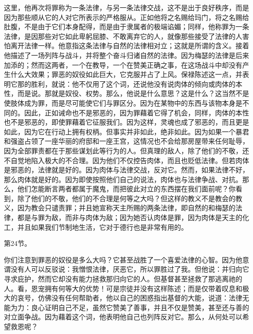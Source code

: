 这里，他再次将罪称为一条法律，与另一条法律交战，这不是出于良好秩序，而是因为那些顺从它的人对它所表示的严格服从。正如他将之名赐给玛门，将之名赐给肚腹，不是由于它们本身配得，而是由于隶属者的极端谄媚；同样，他称罪为一条法律，是因那些对它如此卑躬屈膝、不敢离弃它的人，就像那些接受了法律的人害怕离开法律一样。他意指这条法律与自然的法律相对立；这就是所谓的含义。接着他描述了一场列阵与战斗，并将整个奋斗归诸自然的法律。因为梅瑟的法律是后来加添的；然而这两者，一个在教导，一个在赞美正确之事，在这场战斗中却没有产生什么大效果；罪恶的奴役如此巨大，它克服并占了上风。保禄陈述这一点，并表明它那的胜利，就说：他不仅用了这个词，还说他没有说肉体的倾向或肉体的本性，而是说。那就是奴役、权势。那么，他说是什么意思？这是什么？这当然不是使肢体成为罪，而是尽可能使它们与罪区分。因为在某物中的东西与该物本身是不同的。因此，正如诫命也不是邪恶的，因为罪藉着它得了机会，同样，肉体的本性也不是邪恶的，即使罪藉着它征服我们。因为这样，灵魂也成了邪恶的，而且更是如此，因为它在行动上拥有权柄。但事实并非如此，绝非如此。因为如果一个暴君和强盗占领了一座华丽的府邸和一座王宫，这情况也不会给那房屋带来任何耻辱，因为全部罪责都在于那些谋划此等行为的人。但真理的敌人，除了他们的不敬，还不自觉地陷入极大的不合理。因为他们不仅控告肉体，而且也贬低法律。但若肉体是邪恶的，法律就是好的。因为肉体与法律交战，反对它。然而，如果法律不好，那么肉体就是好的。因为即使按照他们自己的说法，肉体也与法律争战、对抗。那么，他们怎能断言两者都属于魔鬼，而把彼此对立的东西摆在我们面前呢？你看到，除了他们的不敬，他们的不合理是何等之大吗？但这样的教义不是教会的教义，因为教会只谴责罪；并且她宣称天主所赐的两条法律，即自然的和梅瑟的法律，都是与罪为敌，而非与肉体为敌；因为她否认肉体是罪，因为肉体是天主的化工，并且如果我们节制地生活，它对于德行也是非常有用的。\par

第24节。\par

你们注意到罪恶的奴役是多么大吗？它甚至战胜了一个喜爱法律的心智。因为他意谓没有人可以反驳说：我憎恨法律，厌恶它，所以罪胜过了我。但他说：并归向它寻求庇护，然而它却没有能力拯救那归向它的人。但基督甚至拯救了那逃离祂的人。看，恩宠拥有何等大的优势！可是宗徒并没有这样陈述；而是仅带着叹息和极大的哀号，仿佛没有任何帮助者，他以自己的困惑指出基督的大能，说道：法律无能为力：良心证明自己不足，虽然它赞美了善事，并且不仅是赞美，甚至还与善的对立面争战。因为藉着这个词，他表明他自己也列阵反对它。那么，从何处可以希望救恩呢？\par

